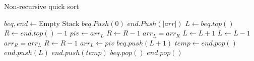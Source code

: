 \documentclass{ctexart}
\begin{document}
\begin{outline}[enumerate]
\begin{algorithm}
    \caption{Non-recursive quick sort}
    \begin{algorithmic}[1]
        \label{algo:3}
         
            \State $beq, end \gets \text{Empty Stack}$
            \State $beq.Push(0)$
            \State $end.Push(|arr|)$
                \State $L \gets beq.top()$
                \State $R \gets end.top() - 1$
                 \Comment{Partition [L, R)}
                    \State $piv \gets arr_L$
                     
                            \State $R \gets R - 1$
                        \EndWhile
                            \State $arr_L = arr_R$
                            \State $L \gets L + 1$
                        \EndIf
                            \State $L \gets L - 1$
                        \EndWhile
                            \State $arr_R = arr_L$
                            \State $R \gets R - 1$
                        \EndIf
                    \EndWhile {}
                    \State $arr_L \gets piv$ \Comment{And we should partition [L+1, end.top()) and [beq.top(), L)}
                    \State $beq.push(L + 1)$ 
                    \State $temp \gets end.pop()$ 
                    \State $end.push(L)$
                    \State $end.push(temp)$
                \Else
                    \State $beq.pop()$
                    \State $end.pop()$
                \EndIf
            \EndWhile
        \EndProcedure
    \end{algorithmic}
\end{algorithm}
\end{outline}
\end{document}
